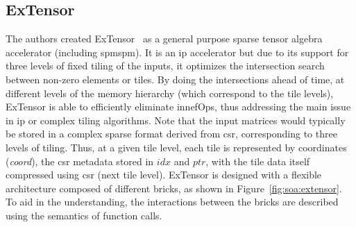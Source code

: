 
\subsection{ExTensor}
\label{sec:soa:extensor}

The authors created ExTensor~\cite{Hegde2019_ExTensor} as a general purpose sparse tensor algebra accelerator (including \acrshort{spmspm}).
It is an \acrshort{ip} accelerator but due to its support for three levels of fixed \gls{tiling} of the inputs, it optimizes the \gls{intersection} search between non-zero elements or \glspl{tile}.
By doing the \glspl{intersection} ahead of time, at different levels of the memory hierarchy (which correspond to the \gls{tile} levels), ExTensor is able to efficiently eliminate \glspl{innefOp}, thus addressing the main issue in \acrshort{ip} or complex \gls{tiling} algorithms.
Note that the input matrices would typically be stored in a complex sparse format derived from \acrshort{csr}, corresponding to three levels of \gls{tiling}.
Thus, at a given \gls{tile} level, each \gls{tile} is represented by coordinates (\textit{coord}), the \acrshort{csr} \gls{metadata} stored in $idx$ and $ptr$, with the \gls{tile} data itself compressed using \acrshort{csr} (next \gls{tile} level).
ExTensor is designed with a flexible architecture composed of different bricks, as shown in Figure~\ref{fig:soa:extensor}.
To aid in the understanding, the interactions between the bricks are described using the semantics of function calls.
